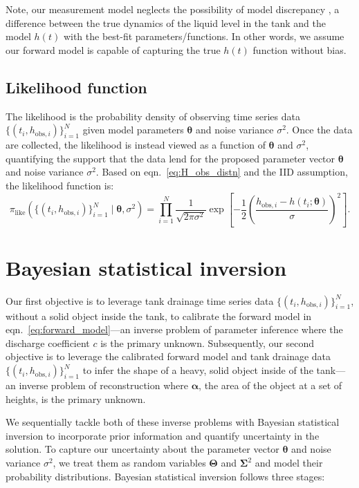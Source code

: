 \documentclass[openacc]{rsproca_new}%
\newcommand\thedata {$\{(t_i,h_{\text{obs}, i})\}_{i=1}^{N}$\xspace}
\newcommand\thedatanomath {\{(t_i,h_{\text{obs}, i})\}_{i=1}^{N}}
\begin{document}
Note, our measurement model neglects the possibility of model discrepancy \cite{brynjarsdottir2014learning,kennedy2001bayesian}, a difference between the true dynamics of the liquid level in the tank and the model $h(t)$ with the best-fit parameters/functions. In other words, we assume our forward model is capable of capturing the true $h(t)$ function without bias.


\subsection{Likelihood function}
The likelihood is the probability density of observing time series data \thedata given model parameters $\boldsymbol \theta$ and noise variance $\sigma^2$. Once the data are collected, the likelihood is instead viewed as a function of $\boldsymbol \theta$ and $\sigma^2$, quantifying the support that the data lend for the proposed parameter vector $\boldsymbol \theta$ and noise variance $\sigma^2$. Based on eqn.~\ref{eq:H_obs_distn} and the IID assumption, the likelihood function is:
\begin{equation}
 \pi_{\text{like}}(\thedatanomath \mid \boldsymbol \theta, \sigma^2 ) = \prod_{i=1}^N \frac{1}{\sqrt{2\pi\sigma^2}} \exp \left[-\frac{1}{2}\left(\frac{h_{\text{obs}, i} - h(t_i; \boldsymbol\theta)}{\sigma} \right)^2 \right]. \label{eq:like}
\end{equation}

\section{Bayesian statistical inversion}
Our first objective is to leverage tank drainage time series data \thedata, without a solid object inside the tank, to calibrate the forward model in eqn.~\ref{eq:forward_model}---an inverse problem of parameter inference where the discharge coefficient $c$ is the primary unknown.
Subsequently, our second objective is to leverage the calibrated forward model and tank drainage data \thedata to infer the shape of a heavy, solid object inside of the tank---an inverse problem of reconstruction where $\boldsymbol \alpha$, the area of the object at a set of heights, is the primary unknown. 

We sequentially tackle both of these inverse problems with Bayesian statistical inversion \cite{calvetti2018inverse,waqar2023tutorial,kaipio2006statistical} to incorporate prior information and quantify uncertainty in the solution.
To capture our uncertainty about the parameter vector $\boldsymbol \theta$ and noise variance $\sigma^2$, we treat them as random variables $\boldsymbol \Theta$ and $\boldsymbol \Sigma^2$ and model their probability distributions. Bayesian statistical inversion follows three stages:
\end{document}

